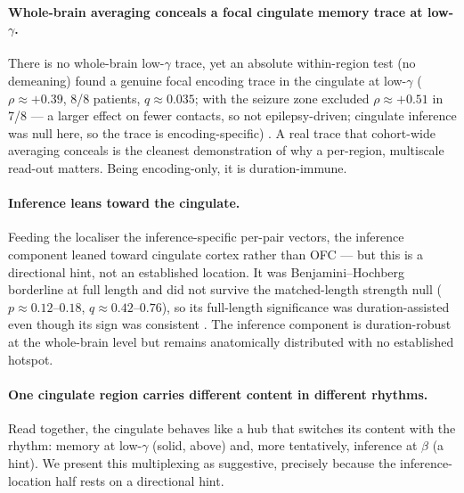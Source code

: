 \documentclass[11pt]{article}
\begin{document}
\paragraph{Whole-brain averaging conceals a focal cingulate memory trace at
low-\texorpdfstring{$\gamma$}{gamma}.}
There is no whole-brain low-$\gamma$ trace, yet an absolute within-region test
(no demeaning) found a genuine focal encoding trace in the cingulate at
low-$\gamma$ ($\rho\approx+0.39$, 8/8 patients, $q\approx0.035$; with the
seizure zone excluded $\rho\approx+0.51$ in 7/8 --- a larger effect on fewer
contacts, so not epilepsy-driven; cingulate inference was null here, so the trace
is encoding-specific)
. A real trace that cohort-wide averaging conceals is the cleanest demonstration
of why a per-region, multiscale read-out matters. Being encoding-only, it is
duration-immune.

\paragraph{Inference leans toward the cingulate.}
Feeding the localiser the inference-specific per-pair vectors, the inference
component leaned toward cingulate cortex rather than OFC --- but this is a
directional hint, not an established location. It was Benjamini--Hochberg
borderline at full length and did not survive the matched-length strength null
($p\approx0.12$--$0.18$, $q\approx0.42$--$0.76$), so its full-length significance
was duration-assisted even though its sign was consistent
. The inference component is duration-robust at the whole-brain level but remains
anatomically distributed with no established hotspot.

\paragraph{One cingulate region carries different content in different rhythms.}
Read together, the cingulate behaves like a hub that switches its content with
the rhythm: memory at low-$\gamma$ (solid, above) and, more tentatively,
inference at $\beta$ (a hint). We present this multiplexing as suggestive,
precisely because the inference-location half rests on a directional hint.
\end{document}
